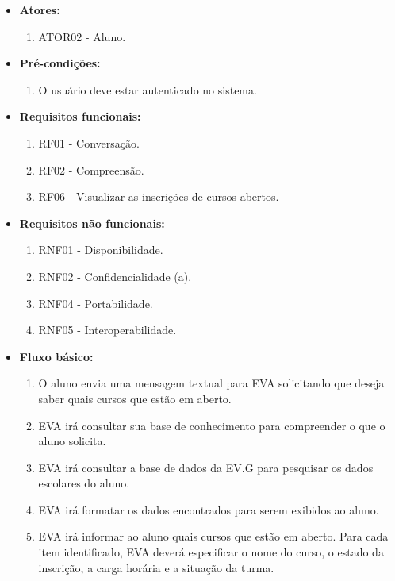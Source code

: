 \begin{itemize}
    \item \textbf{Atores:}
        \begin{enumerate}
            \item ATOR02 - Aluno.
        \end{enumerate}
    \item \textbf{Pré-condições:}
        \begin{enumerate}
            \item O usuário deve estar autenticado no sistema.
        \end{enumerate}
    \item \textbf{Requisitos funcionais:}
        \begin{enumerate}
            \item RF01 - Conversação.
            \item RF02 - Compreensão.
            \item RF06 - Visualizar as inscrições de cursos abertos.
        \end{enumerate}
    \item \textbf{Requisitos não funcionais:}
        \begin{enumerate}
            \item RNF01 - Disponibilidade.
            \item RNF02 - Confidencialidade (a).
            \item RNF04 - Portabilidade.
            \item RNF05 - Interoperabilidade.
        \end{enumerate}
    \item \textbf{Fluxo básico:}
        \begin{enumerate}
            \item O aluno envia uma mensagem textual para EVA solicitando que deseja saber quais cursos que estão em aberto.
            \item EVA irá consultar sua base de conhecimento para compreender o que o aluno solicita.
            \item EVA irá consultar a base de dados da EV.G para pesquisar os dados escolares do aluno.
            \item EVA irá formatar os dados encontrados para serem exibidos ao aluno.
            \item EVA irá informar ao aluno quais cursos que estão em aberto. Para cada item identificado, EVA deverá especificar o nome do curso, o estado da inscrição, a carga horária e a situação da turma. 
        \end{enumerate}
        

\end{itemize}
